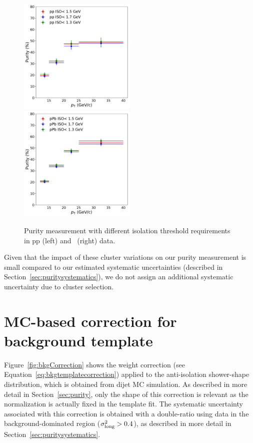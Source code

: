 \begin{figure}
	\center
	\includegraphics[width=0.495\textwidth]{Appendices/ppiso.pdf}
	\includegraphics[width=0.495\textwidth]{Appendices/ppbiso.pdf}
	\caption{Purity measurement with different isolation threshold requirements in pp (left) and \pPb~(right) data.}
	\label{fig:isolationvariation}
\end{figure}




Given that the impact of these cluster variations on our purity measurement is small compared to our estimated systematic uncertainties (described in Section~\ref{sec:puritysystematics}), we do not assign an additional systematic uncertainty due to cluster selection. 

\section{MC-based correction for background template}
\label{sec:MCbasedcorrection}

Figure~\ref{fig:bkgCorrection} shows the weight correction (see Equation~\ref{eq:bkgtemplatecorrection}) applied to the anti-isolation shower-shape distribution, which is obtained from dijet MC simulation. As described in more detail in Section~\ref{sec:purity}, only the shape of this correction is relevant as the normalization is actually fixed in the template fit. The systematic uncertainty associated with this correction is obtained with a double-ratio using data in the background-dominated region ($\sigma^{2}_{\mathrm{long}}>0.4$), as described in more detail in Section~\ref{sec:puritysystematics}. 

